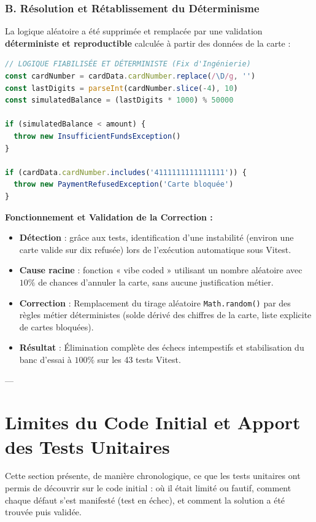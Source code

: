 \documentclass[12pt,a4paper]{article}
\begin{document}
\subsubsection*{B. Résolution et Rétablissement du Déterminisme}
La logique aléatoire a été supprimée et remplacée par une validation \textbf{déterministe et reproductible} calculée à partir des données de la carte :
\begin{lstlisting}[language=typescript]
// LOGIQUE FIABILISÉE ET DÉTERMINISTE (Fix d'Ingénierie)
const cardNumber = cardData.cardNumber.replace(/\D/g, '')
const lastDigits = parseInt(cardNumber.slice(-4), 10)
const simulatedBalance = (lastDigits * 1000) % 50000

if (simulatedBalance < amount) {
  throw new InsufficientFundsException()
}

if (cardData.cardNumber.includes('4111111111111111')) {
  throw new PaymentRefusedException('Carte bloquée')
}
\end{lstlisting}

\begin{tcolorbox}[preuvebox]
\textbf{Fonctionnement et Validation de la Correction :}
\begin{itemize}
    \item \textbf{Détection} : grâce aux tests, identification d'une instabilité (environ une carte valide sur dix refusée) lors de l'exécution automatique sous Vitest.
    \item \textbf{Cause racine} : fonction « vibe coded » utilisant un nombre aléatoire avec $10\%$ de chances d'annuler la carte, sans aucune justification métier.
    \item \textbf{Correction} : Remplacement du tirage aléatoire \texttt{Math.random()} par des règles métier déterministes (solde dérivé des chiffres de la carte, liste explicite de cartes bloquées).
    \item \textbf{Résultat} : Élimination complète des échecs intempestifs et stabilisation du banc d'essai à $100\%$ sur les 43 tests Vitest.
\end{itemize}
\end{tcolorbox}

---

\section{Limites du Code Initial et Apport des Tests Unitaires}
Cette section présente, de manière chronologique, ce que les tests unitaires ont permis de découvrir sur le code initial : où il était limité ou fautif, comment chaque défaut s'est manifesté (test en échec), et comment la solution a été trouvée puis validée.
\end{document}
